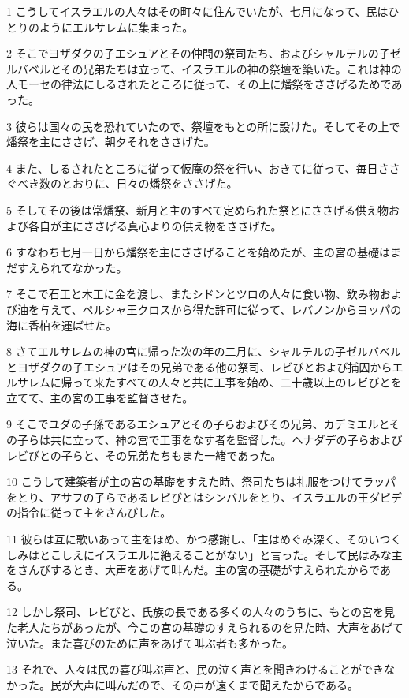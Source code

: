 \par 1 こうしてイスラエルの人々はその町々に住んでいたが、七月になって、民はひとりのようにエルサレムに集まった。
\par 2 そこでヨザダクの子エシュアとその仲間の祭司たち、およびシャルテルの子ゼルバベルとその兄弟たちは立って、イスラエルの神の祭壇を築いた。これは神の人モーセの律法にしるされたところに従って、その上に燔祭をささげるためであった。
\par 3 彼らは国々の民を恐れていたので、祭壇をもとの所に設けた。そしてその上で燔祭を主にささげ、朝夕それをささげた。
\par 4 また、しるされたところに従って仮庵の祭を行い、おきてに従って、毎日ささぐべき数のとおりに、日々の燔祭をささげた。
\par 5 そしてその後は常燔祭、新月と主のすべて定められた祭とにささげる供え物および各自が主にささげる真心よりの供え物をささげた。
\par 6 すなわち七月一日から燔祭を主にささげることを始めたが、主の宮の基礎はまだすえられてなかった。
\par 7 そこで石工と木工に金を渡し、またシドンとツロの人々に食い物、飲み物および油を与えて、ペルシャ王クロスから得た許可に従って、レバノンからヨッパの海に香柏を運ばせた。
\par 8 さてエルサレムの神の宮に帰った次の年の二月に、シャルテルの子ゼルバベルとヨザダクの子エシュアはその兄弟である他の祭司、レビびとおよび捕囚からエルサレムに帰って来たすべての人々と共に工事を始め、二十歳以上のレビびとを立てて、主の宮の工事を監督させた。
\par 9 そこでユダの子孫であるエシュアとその子らおよびその兄弟、カデミエルとその子らは共に立って、神の宮で工事をなす者を監督した。ヘナダデの子らおよびレビびとの子らと、その兄弟たちもまた一緒であった。
\par 10 こうして建築者が主の宮の基礎をすえた時、祭司たちは礼服をつけてラッパをとり、アサフの子らであるレビびとはシンバルをとり、イスラエルの王ダビデの指令に従って主をさんびした。
\par 11 彼らは互に歌いあって主をほめ、かつ感謝し、「主はめぐみ深く、そのいつくしみはとこしえにイスラエルに絶えることがない」と言った。そして民はみな主をさんびするとき、大声をあげて叫んだ。主の宮の基礎がすえられたからである。
\par 12 しかし祭司、レビびと、氏族の長である多くの人々のうちに、もとの宮を見た老人たちがあったが、今この宮の基礎のすえられるのを見た時、大声をあげて泣いた。また喜びのために声をあげて叫ぶ者も多かった。
\par 13 それで、人々は民の喜び叫ぶ声と、民の泣く声とを聞きわけることができなかった。民が大声に叫んだので、その声が遠くまで聞えたからである。

